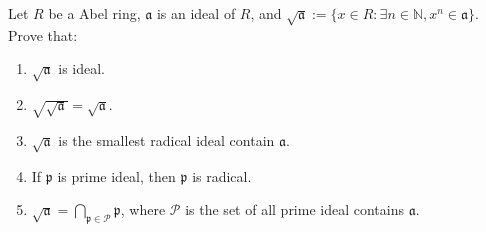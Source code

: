 \documentclass{ctexart}
\newif\ifpreface
\renewcommand{\theproblem}{\Roman{problem}}
\newcommand\<{\langle}
\renewcommand\>{\rangle}
\newcommand\N{\mathbb{N}}
\newcommand{\fra}{\mathfrak{a}}
\begin{document}
\large
\setlength{\baselineskip}{1.2em}
\ifpreface

\else
\maketitle
\fi
{}
\begin{problem}
  Let $R$ be a Abel ring, $\fra$ is an ideal of $R$, and $\sqrt{\fra}:=\{x\in R:\exists n\in\N,x^n\in\fra\}$. Prove that:
  \begin{enumerate}[ref=\theproblem.\arabic*]
    \item\label{it:11} $\sqrt{\mathfrak{a}}$ is ideal.
    \item\label{it:12} $\sqrt{\sqrt{\mathfrak{a}}}=\sqrt{\mathfrak{a}}$.
    \item\label{it:13} $\sqrt{\fra}$ is the smallest radical ideal contain $\mathfrak{a}$.
    \item\label{it:14} If $\mathfrak{p}$ is prime ideal, then $\mathfrak{p}$ is radical.
    \item\label{it:15} $\sqrt{\mathfrak{a}}=\bigcap_{\mathfrak{p}\in\mathcal{P}}\mathfrak{p}$, where $\mathcal{P}$ is the set of all prime ideal contains $\fra$.
  \end{enumerate}
\end{problem}
\end{document}
